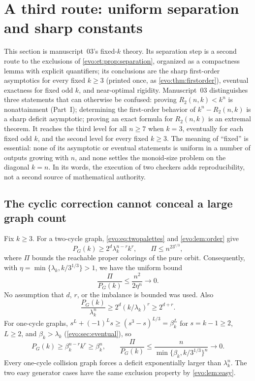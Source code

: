 \documentclass[11pt,a4paper]{article}
\numberwithin{equation}{section}
\theoremstyle{definition}
\theoremstyle{remark}
\begin{document}
\section{A third route: uniform separation and sharp constants}\label{evo:sec:sharp}

This section is manuscript~03's fixed-$k$ theory. Its separation step is a
second route to the exclusions of \cref{evo:et:prop:separation}, organized as
a compactness lemma with explicit quantifiers; its conclusions are the sharp
first-order asymptotics for every fixed $k\ge3$ (printed once, as
\cref{evo:thm:firstorder}), eventual exactness for fixed odd $k$, and
near-optimal rigidity. Manuscript~03 distinguishes three statements that can
otherwise be confused: proving $R_2(n,k)<k^n$ is nonattainment (Part~I);
determining the first-order behavior of $k^n-R_2(n,k)$ is a sharp deficit
asymptotic; proving an exact formula for $R_2(n,k)$ is an extremal theorem.
It reaches the third level for all $n\ge7$ when $k=3$, eventually for each
fixed odd $k$, and the second level for every fixed $k\ge3$. The meaning of
``fixed'' is essential: none of its asymptotic or eventual statements is
uniform in a number of outputs growing with $n$, and none settles the
monoid-size problem on the diagonal $k=n$. In its words, the execution of two
checkers adds reproducibility, not a second source of mathematical
authority.

\subsection{The cyclic correction cannot conceal a large graph count}

Fix $k\ge3$. For a two-cycle graph, \eqref{evo:eq:twopalettes} and
\cref{evo:lem:order} give
\[
 P_G(k)\ge2^d\lambda_k^{n-r}k^r,\qquad \Pi\le n^23^{r/3},
\]
where $\Pi$ bounds the reachable proper colorings of the pure orbit.
Consequently, with $\eta=\min\{\lambda_k,k/3^{1/3}\}>1$, we have the uniform
bound
\begin{equation}\label{evo:da:eq:uniformperiod}
 \frac{\Pi}{P_G(k)}\le\frac{n^2}{2\eta^n}\longrightarrow0.
\end{equation}
No assumption that $d$, $r$, or the imbalance is bounded was used. Also
\begin{equation}\label{evo:da:eq:drbound}
 \frac{P_G(k)}{\lambda_k^n}\ge2^d(k/\lambda_k)^r\ge2^{d+r}.
\end{equation}
For one-cycle graphs, $s^L+(-1)^Ls\ge(s^3-s)^{L/3}=\beta_k^L$ for $s=k-1\ge2$,
$L\ge2$, and $\beta_k>\lambda_k$ (\cref{evo:sec:eventual}), so
\[
 P_G(k)\ge\beta_k^{n-r}k^r\ge\beta_k^n,\qquad
 \frac{\Pi}{P_G(k)}\le\frac{n}{\min\{\beta_k,k/3^{1/3}\}^n}\longrightarrow0.
\]
Every one-cycle collision graph forces a deficit exponentially larger than
$\lambda_k^n$. The two easy generator cases have the same exclusion property
by \cref{evo:lem:easy}.
\end{document}
